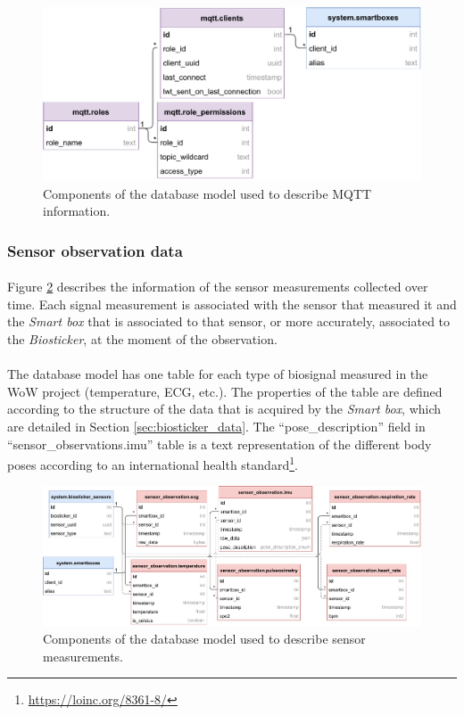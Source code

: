 \begin{figure}[H]
    \centering
    \includegraphics[width=0.75\linewidth]{images/database-schema-mqtt.pdf}
    \caption{Components of the database model used to describe \acs{MQTT} information. }
    \label{fig:wow-dbschema-mqtt}
\end{figure}


\subsubsection{Sensor observation data}

\paragraph{} Figure \ref{fig:wow-dbschema-sensors} describes the information of the sensor measurements collected over time. Each signal measurement is associated with the sensor that measured it and the \textit{Smart box} that is associated to that sensor, or more accurately, associated to the \textit{Biosticker}, at the moment of the observation.

\paragraph{} The database model has one table for each type of biosignal measured in the \acs{WoW} project (temperature, \acs{ECG}, etc.). The properties of the table are defined according to the structure of the data that is acquired by the \textit{Smart box}, which are detailed in Section \ref{sec:biosticker_data}. The ``pose\_description'' field in ``sensor\_observations.imu'' table is a text representation of the different body poses according to an international health standard\footnote{\url{https://loinc.org/8361-8/}}.

\begin{figure}[H]
    \centering
    \includegraphics[width=\linewidth]{images/database-schema-sensordata.pdf}
    \caption{Components of the database model used to describe sensor measurements. }
    \label{fig:wow-dbschema-sensors}
\end{figure}



